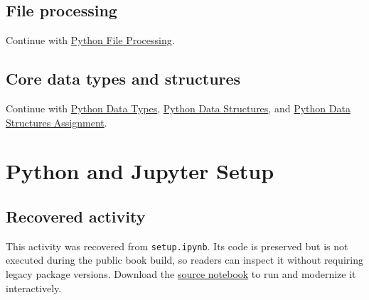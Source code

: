 \documentclass[
  letterpaper,
]{scrbook}
\begin{document}
\section*{File processing}\label{sec-pr-toolkit-files}


Continue with \hyperref[sec-lab-python-file-processing]{Python File
Processing}.

\section*{Core data types and structures}\label{sec-pr-toolkit-data}


Continue with \hyperref[sec-lab-python-data-types]{Python Data Types},
\hyperref[sec-lab-python-data-structures]{Python Data Structures}, and
\hyperref[sec-lab-python-data-structures-assignment]{Python Data
Structures Assignment}.

\chapter*{Python and Jupyter Setup}\label{ch-lab-setup}


\section*{Recovered activity}\label{sec-lab-setup}


\begin{tcolorbox}[enhanced jigsaw, arc=.35mm, bottomrule=.15mm, bottomtitle=1mm, breakable, colback=white, colbacktitle=quarto-callout-note-color!10!white, colframe=quarto-callout-note-color-frame, coltitle=black, left=2mm, leftrule=.75mm, opacityback=0, opacitybacktitle=0.6, rightrule=.15mm, title=\textcolor{quarto-callout-note-color}{\faInfo}\hspace{0.5em}{Historical source and execution note}, titlerule=0mm, toprule=.15mm, toptitle=1mm]

This activity was recovered from \texttt{setup.ipynb}. Its code is
preserved but is not executed during the public book build, so readers
can inspect it without requiring legacy package versions. Download the
\href{../notebooks/setup.ipynb}{source notebook} to run and modernize it
interactively.

\end{tcolorbox}
\end{document}
